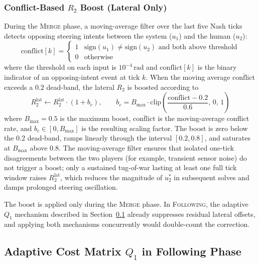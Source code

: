 \documentclass[12pt,a4paper,oneside]{report}
\begin{document}
\subsubsection{Conflict-Based $R_2$ Boost (Lateral Only)}

During the \textsc{Merge} phase, a moving-average filter over the last five Nash ticks detects opposing steering intents between the system ($u_1$) and the human ($u_2$):
\begin{equation}
\mathrm{conflict}[k] = \begin{cases}
1 & \mathrm{sign}(u_1) \neq \mathrm{sign}(u_2) \text{ and both above threshold} \\
0 & \text{otherwise}
\end{cases}
\label{eq:conflict_indicator}
\end{equation}
where the threshold on each input is $10^{-4}\,\mathrm{rad}$ and $\mathrm{conflict}[k]$ is the binary indicator of an opposing-intent event at tick $k$. When the moving average $\overline{\mathrm{conflict}}$ exceeds a $0.2$ dead-band, the lateral $R_2$ is boosted according to
\begin{equation}
R_2^{\text{lat}} \leftarrow R_2^{\text{lat}} \cdot \left( 1 + b_c \right), \qquad b_c = B_{\max} \cdot \mathrm{clip}\!\left( \frac{\overline{\mathrm{conflict}} - 0.2}{0.6}, \, 0, \, 1 \right)
\label{eq:conflict_boost}
\end{equation}
where $B_{\max} = 0.5$ is the maximum boost, $\overline{\mathrm{conflict}}$ is the moving-average conflict rate, and $b_c \in [0, B_{\max}]$ is the resulting scaling factor. The boost is zero below the 0.2 dead-band, ramps linearly through the interval $[0.2, 0.8]$, and saturates at $B_{\max}$ above 0.8. The moving-average filter ensures that isolated one-tick disagreements between the two players (for example, transient sensor noise) do not trigger a boost; only a sustained tug-of-war lasting at least one full tick window raises $R_2^{\text{lat}}$, which reduces the magnitude of $u_2^{*}$ in subsequent solves and damps prolonged steering oscillation.

The boost is applied only during the \textsc{Merge} phase. In \textsc{Following}, the adaptive $Q_1$ mechanism described in Section~\ref{sec:nash_q1} already suppresses residual lateral offsets, and applying both mechanisms concurrently would double-count the correction.


\subsection{Adaptive Cost Matrix $Q_1$ in Following Phase}
\label{sec:nash_q1}
\end{document}
